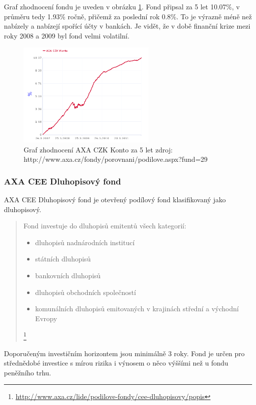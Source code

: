 \documentclass[a4paper,12pt]{article}
\begin{document}
			Graf zhodnocení fondu je uveden v obrázku \ref{axa_czk_konto}. Fond připsal za 5 let 10.07\%, v průměru tedy 1.93\% ročně, přičemž za poslední rok 0.8\%. To je výrazně méně než nabízely a nabízejí spořící účty v bankách. Je vidět, že v době finanční krize mezi roky 2008 a 2009 byl fond velmi volatilní. 
			\begin{figure}[h!]
		  	\centering
				\includegraphics[width=0.6\textwidth]{axa_czk_konto.png}			
				\caption{Graf zhodnocení AXA CZK Konto za 5 let zdroj: http://www.axa.cz/fondy/porovnani/podilove.aspx?fund=29}
				\label{axa_czk_konto}
			\end{figure}
		\subsubsection{AXA CEE Dluhopisový fond}
			AXA CEE Dluhopisový fond je otevřený podílový fond klasifikovaný jako dluhopisový. 
			\begin{quote}
				Fond investuje do dluhopisů emitentů všech kategorií:
				\begin{itemize}
			    \item dluhopisů nadnárodních institucí
			    \item státních dluhopisů
			    \item bankovních dluhopisů
			    \item dluhopisů obchodních společností
			    \item komunálních dluhopisů emitovaných v krajinách střední a východní Evropy			
    	  \end{itemize}
    	  \footnote{\url{http://www.axa.cz/lide/podilove-fondy/cee-dluhopisovy/popis}}
		  \end{quote}						
			
			Doporučeným investičním horizontem jsou minimálně 3 roky. Fond je určen pro střednědobé investice s mírou rizika i výnosem o něco výššími než u fondu peněžního trhu.
			
\end{document}
